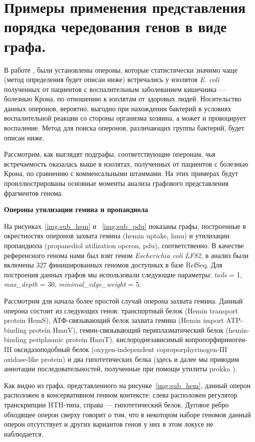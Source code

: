 \section{Примеры применения представления порядка чередования генов в виде графа.}

В работе \cite{rakitina2017genome}, были установлены опероны, которые статистически значимо чаще (метод определения будет описан ниже) встречались у изолятов \textit{E. coli} полученных от пациентов с воспалительным заболеванием кишечника --- болезнью Крона, по отношению к изолятам от здоровых людей. Носительство данных оперонов, вероятно, выгодно при нахождении бактерий в условиях воспалительной реакции со стороны организма хозяина, а может и провоцирует воспаление. Метод для поиска оперонов, различающих группы бактерий, будет описан ниже.

Рассмотрим, как выглядят подграфы, соответствующие оперонам, чья встречаемость оказалась выше в изолятах, полученных от пациентов с болезнью Крона, по сравнению с комменсальными штаммами. На этих примерах будут проиллюстрированы основные моменты анализа графового представления фрагментов генома. 

\textbf{Опероны утилизации гемина и пропандиола}

На рисунках~\ref{img:sub_hem} и ~\ref{img:sub_pdu} показаны графы, построенные в окрестностях оперонов захвата гемина (hemin uptake, hmu) и утилизации пропандиола (propanediol utilization operon, pdu), соответственно. В качестве референсного генома нами был взят геном \textit{Escherichia coli LF82}, в анализ были включены 327 финишированных геномов доступных в базе RefSeq. Для построения данных графов мы использовали следующие параметры: \textit{tails} = 1, \textit{max\_depth} = 30, \textit{minimal\_edge\_weight} = 5. 

Рассмотрим для начала более простой случай оперона захвата гемина. Данный оперона состоит из следующих генов: транспортный белок (Hemin transport protein HemS), АТФ-связывающий белок захвата гемина (Hemin import ATP-binding protein HmuV), гемин-связывающий периплазматический белок (hemin-binding periplasmic protein HmuT), кислороднезависимый копропорфириноген-III оксидазоподобный белок (oxygen-independent coproporphyrinogen-III oxidase-like protein) и два гипотетических белка (здесь и далее мы приводим аннотации последовательностей, полученные при помощи утилиты prokka \cite{seemann2014prokka}).

Как видно из графа, представленного на рисунке~\ref{img:sub_hem}, данный оперон расположен в консервативном генном контексте: слева расположен регулятор транскрипции HTH-типа, справа --- гипотетический белок. Дуговое ребро обходящее оперон сверху говорит о том, что в некотором наборе геномов данный оперон отсутствует и других вариантов генов у них в этом локусе не наблюдается. 

